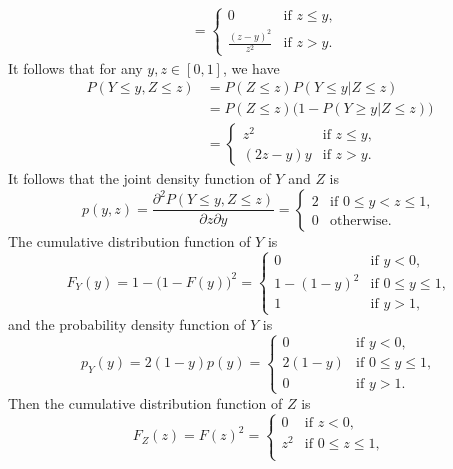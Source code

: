 \documentclass[12pt,letterpaper, onecolumn]{exam}
\begin{document}
\begin{questions}
\begin{solution}
\begin{align*}
                &=\begin{cases}
                    0&\text{if }z\le y,\\
                    \frac{(z-y)^2}{z^2}&\text{if }z>y.
                \end{cases}
            \end{align*}
            It follows that for any $y,z\in[0,1]$, we have
            \begin{align*}
                P(Y\le y,Z\le z)&=P(Z\le z)P(Y\le y|Z\le z)\\
                &=P(Z\le z)\Big(1-P(Y\ge y|Z\le z)\Big)\\
                &=\begin{cases}
                    z^2&\mbox{if }z\le y,\\
                    (2z-y)y&\mbox{if }z>y.
                \end{cases}
            \end{align*}
            It follows that the joint density function of $Y$ and $Z$ is
            $$p(y,z)=\frac{\partial^2P(Y\le y,Z\le z)}{\partial z\partial y}=\begin{cases}
                2&\text{if }0\le y<z\le 1,\\
                0&\text{otherwise}.
            \end{cases}$$
            \quad The cumulative distribution function of $Y$ is
            $$F_Y(y)=1-\big(1-F(y)\big)^2=\begin{cases}
                0&\text{if $y<0$},\\
                1-(1-y)^2&\text{if $0\le y\le 1$},\\
                1&\text{if $y>1$},
            \end{cases}
                $$
            and the probability density function of $Y$ is
            $$
                p_Y(y)=2(1-y)p(y)=\begin{cases}
                    0&\text{if $y<0$},\\
                    2(1-y)&\text{if $0\le y\le 1$},\\
                    0&\text{if $y>1$}.
                \end{cases}
            $$
            Then the cumulative distribution function of $Z$ is 
            $$F_Z(z)=F(z)^2=\begin{cases}
                0&\text{if $z<0$},\\
                z^2&\text{if $0\le z\le 1$},\\

\end{cases}$$
\end{solution}
\end{questions}
\end{document}
